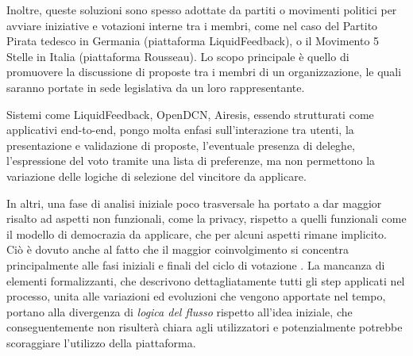 \documentclass[12pt,a4paper,openright,twoside]{book}
\begin{document}
Inoltre, queste soluzioni sono spesso adottate da partiti o movimenti politici per avviare iniziative
e votazioni interne tra i membri, come nel caso del Partito Pirata tedesco in Germania (piattaforma LiquidFeedback),
o il Movimento 5 Stelle in Italia (piattaforma Rousseau). Lo scopo principale è quello di promuovere la discussione
di proposte tra i membri di un organizzazione, le quali saranno portate in sede legislativa da un loro rappresentante\cite{korthagen2020non}.

Sistemi come LiquidFeedback, OpenDCN, Airesis, essendo strutturati come applicativi end-to-end,
pongo molta enfasi sull'interazione tra utenti, la presentazione e validazione di proposte,
l'eventuale presenza di deleghe, l'espressione del voto tramite una lista di preferenze, ma
non permettono la variazione delle logiche di selezione del vincitore da applicare\cite{Trapanese:2018}.

In altri, una fase di analisi iniziale poco trasversale ha portato a dar maggior risalto
ad aspetti non funzionali, come la privacy, rispetto a quelli funzionali come il modello di democrazia
da applicare, che per alcuni aspetti rimane implicito\cite{Pianini:2019}.
Ciò è dovuto anche al fatto che il maggior coinvolgimento si concentra 
principalmente alle fasi iniziali e finali del ciclo di votazione \cite{hennen2020european}.
La mancanza di elementi formalizzanti, che descrivono dettagliatamente tutti gli step applicati nel
processo, unita alle variazioni ed evoluzioni che vengono apportate nel tempo, portano alla divergenza di \textit{logica del flusso} rispetto all'idea iniziale, 
che conseguentemente non risulterà chiara agli utilizzatori e potenzialmente potrebbe scoraggiare l'utilizzo della piattaforma\cite{Pianini:2019}.
\end{document}
